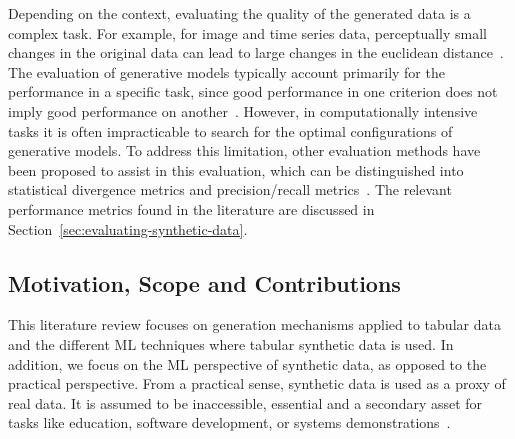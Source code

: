 \documentclass[parskip=full]{scrartcl}
\begin{document}
Depending on the context, evaluating the quality of the generated data is a
complex task. For example, for image and time series data, perceptually small
changes in the original data can lead to large changes in the euclidean
distance~\cite{assefa2020generating, theis2016note}. The evaluation of
generative models typically account primarily for the performance in a
specific task, since good performance in one criterion does not imply good
performance on another~\cite{theis2016note}. However, in computationally
intensive tasks it is often impracticable to search for the optimal
configurations of generative models. To address this limitation, other
evaluation methods have been proposed to assist in this evaluation, which can
be distinguished into statistical divergence metrics and precision/recall
metrics~\cite{alaa2022faithful}. The relevant performance metrics found in the
literature are discussed in Section~\ref{sec:evaluating-synthetic-data}.


\subsection{Motivation, Scope and Contributions}


This literature review focuses on generation mechanisms applied to tabular
data and the different ML techniques where tabular synthetic data is used. In
addition, we focus on the ML perspective of synthetic data, as opposed to the
practical perspective. From a practical sense, synthetic data is used as a
proxy of real data. It is assumed to be inaccessible, essential and a
secondary asset for tasks like education, software development, or systems
demonstrations~\cite{mannino2019real}. 
\end{document}
